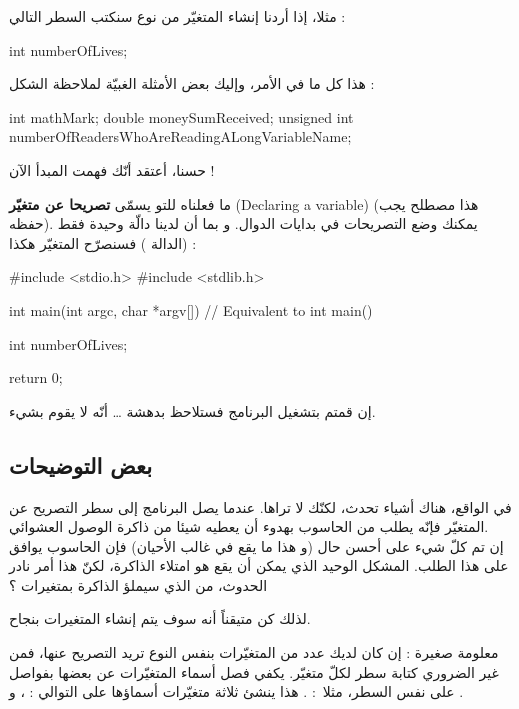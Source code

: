  مثلا، إذا أردنا إنشاء المتغيّر
 من نوع
سنكتب السطر التالي :

\begin{Csource}
int numberOfLives;
\end{Csource}

هذا كل ما في الأمر، وإليك بعض الأمثلة الغبيّة لملاحظة الشكل :

\begin{Csource}
int mathMark;
double moneySumReceived;
unsigned int numberOfReadersWhoAreReadingALongVariableName;
\end{Csource}

حسنا، أعتقد أنّك فهمت المبدأ الآن !

ما فعلناه للتو يسمّى
\textbf{تصريحا عن متغيّر}
(\textenglish{Declaring a variable})
(هذا مصطلح يجب حفظه). يمكنك وضع التصريحات في بدايات الدوال. و بما أن لدينا دالّة وحيدة فقط
(الدالة
)
فسنصرّح المتغيّر هكذا :

\begin{Csource}
#include <stdio.h>
#include <stdlib.h>

int main(int argc, char *argv[]) // Equivalent to int main()
{
  int numberOfLives;

  return 0;
}
\end{Csource}

إن قمتم بتشغيل البرنامج فستلاحظ بدهشة 
\dots
أنّه لا يقوم بشيء.

\subsection{بعض التوضيحات}

في الواقع، هناك أشياء تحدث، لكنّك لا تراها. عندما يصل البرنامج إلى سطر التصريح عن المتغيّر فإنّه يطلب من الحاسوب بهدوء أن يعطيه شيئا من ذاكرة الوصول العشوائي.\\
إن تم كلّ شيء على أحسن حال (و هذا ما يقع في غالب الأحيان) فإن الحاسوب يوافق على هذا الطلب.
المشكل الوحيد الذي يمكن أن يقع هو امتلاء الذاكرة، لكنّ هذا أمر نادر الحدوث، من الذي سيملؤ الذاكرة بمتغيرات
 ؟

لذلك كن متيقناً أنه سوف يتم إنشاء المتغيرات بنجاح.

\begin{information}
  معلومة صغيرة : إن كان لديك عدد من المتغيّرات بنفس النوع تريد التصريح عنها، فمن غير الضروري كتابة سطر لكلّ متغيّر. يكفي فصل أسماء المتغيّرات عن بعضها بفواصل على نفس السطر، مثلا~:
.
هذا ينشئ ثلاثة متغيّرات أسماؤها على التوالي :
، 
و
.
\end{information}


